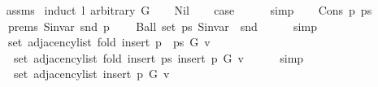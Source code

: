 \begin{isabellebody}
%
\isadelimproof
\ \ %
\endisadelimproof
%
\isatagproof
{}\isamarkupfalse%
\ assms\isanewline
{}\isamarkupfalse%
\ {\isacharparenleft}{\kern0pt}induct\ l\ arbitrary{\isacharcolon}{\kern0pt}\ G{\isacharparenright}{\kern0pt}\isanewline
\ \ \isamarkupfalse%
\ Nil\isanewline
\ \ \isamarkupfalse%
\ {\isacharquery}{\kern0pt}case\isanewline
\ \ \ \ \isamarkupfalse%
\ simp\isanewline
{}\isamarkupfalse%
\isanewline
\ \ \isamarkupfalse%
\ {\isacharparenleft}{\kern0pt}Cons\ p\ ps{\isacharparenright}{\kern0pt}\isanewline
\ \ \isamarkupfalse%
\isanewline
\ \ \ \ prems{\isacharcolon}{\kern0pt}\ {\isachardoublequoteopen}S{\isachardot}{\kern0pt}invar\ {\isacharparenleft}{\kern0pt}snd\ p{\isacharparenright}{\kern0pt}{\isachardoublequoteclose}\isanewline
\ \ \ \ {\isachardoublequoteopen}Ball\ {\isacharparenleft}{\kern0pt}set\ ps{\isacharparenright}{\kern0pt}\ {\isacharparenleft}{\kern0pt}S{\isachardot}{\kern0pt}invar\ {\isasymcirc}\ snd{\isacharparenright}{\kern0pt}{\isachardoublequoteclose}\isanewline
\ \ \ \ \isamarkupfalse%
\ simp{\isacharplus}{\kern0pt}\isanewline
\isanewline
\ \ \isamarkupfalse%
\isanewline
\ \ \ \ {\isachardoublequoteopen}set\ {\isacharparenleft}{\kern0pt}adjacency{\isacharunderscore}{\kern0pt}list\ {\isacharparenleft}{\kern0pt}fold\ insert{\isacharunderscore}{\kern0pt}{}\ {\isacharparenleft}{\kern0pt}p\ {\isacharhash}{\kern0pt}\ ps{\isacharparenright}{\kern0pt}\ G{\isacharparenright}{\kern0pt}\ v{\isacharparenright}{\kern0pt}\ {\isacharequal}{\kern0pt}\isanewline
\ \ \ \ \ set\ {\isacharparenleft}{\kern0pt}adjacency{\isacharunderscore}{\kern0pt}list\ {\isacharparenleft}{\kern0pt}fold\ insert{\isacharunderscore}{\kern0pt}{}\ ps\ {\isacharparenleft}{\kern0pt}insert{\isacharunderscore}{\kern0pt}{}\ p\ G{\isacharparenright}{\kern0pt}{\isacharparenright}{\kern0pt}\ v{\isacharparenright}{\kern0pt}{\isachardoublequoteclose}\isanewline
\ \ \ \ \isamarkupfalse%
\ simp\isanewline
\ \ \isamarkupfalse%
\ \isamarkupfalse%
\isanewline
\ \ \ \ {\isachardoublequoteopen}{\isachardot}{\kern0pt}{\isachardot}{\kern0pt}{\isachardot}{\kern0pt}\ {\isacharequal}{\kern0pt}\isanewline
\ \ \ \ \ set\ {\isacharparenleft}{\kern0pt}adjacency{\isacharunderscore}{\kern0pt}list\ {\isacharparenleft}{\kern0pt}insert{\isacharunderscore}{\kern0pt}{}\ p\ G{\isacharparenright}{\kern0pt}\ v{\isacharparenright}{\kern0pt}\ {\isasymunion}\isanewline

\end{isabellebody}
